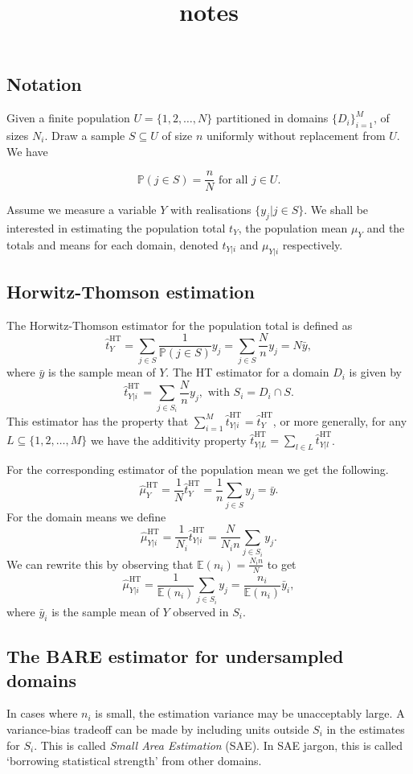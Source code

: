 \documentclass[fleqn,11pt]{article}
\title{notes}
\begin{document}
\subsection*{Notation}
Given a finite population $U=\{1,2,\ldots, N\}$ partitioned in domains
$\{D_i\}_{i=1}^M$, of sizes $N_i$.  Draw a sample $S\subseteq U$ of size
$n$ uniformly without replacement from $U$. We have

$$
\mathbb{P}(j\in S) = \frac{n}{N}\textrm{ for all } j\in U.
$$

Assume we measure a variable $Y$ with realisations $\{y_j|j\in S\}$. We shall
be interested in estimating the population total $t_Y$, the population mean
$\mu_Y$ and the totals and means for each domain, denoted $t_{Y|i}$ and $\mu_{Y|i}$
respectively.

\subsection*{Horwitz-Thomson estimation}
The Horwitz-Thomson estimator for the population total is defined as
$$
\hat{t}^{\textrm{HT}}_Y = \sum_{j\in S} \frac{1}{\mathbb{P}(j\in S)}y_j
=\sum_{j\in S}\frac{N}{n}y_j = N\bar{y},
$$
where $\bar{y}$ is the sample mean of $Y$.  The HT estimator for a domain $D_i$
is given by
$$
\hat{t}_{Y|i}^{\textrm{HT}} = \sum_{j\in S_i}\frac{N}{n}y_j,\textrm{ with } S_i=D_i\cap S.
$$
This estimator has the property that
$\sum_{i=1}^M\hat{t}_{Y|i}^{\textrm{HT}}=\hat{t}_{Y}^{\textrm{HT}}$, or more
generally, for any $L\subseteq \{1,2,\ldots,M\}$ we have the additivity
property $\hat{t}^{\textrm{HT}}_{Y|L} = \sum_{l\in
L}\hat{t}^{\textrm{HT}}_{Y|l}$.


For the corresponding estimator of the population mean we get the following.
$$
\hat{\mu}_{Y}^{\textrm{HT}} = \frac{1}{N}\hat{t}^{\textrm{HT}}_Y = 
\frac{1}{n}\sum_{j\in S}y_j = \bar{y}.
$$
For the domain means we define
$$
\hat{\mu}_{Y|i}^{\textrm{HT}} = \frac{1}{N_i}\hat{t}^{\textrm{HT}}_{Y|i}
= \frac{N}{N_i n}\sum_{j\in S_i}y_j.
$$
We can rewrite this by observing that $\mathbb{E}(n_i)=\frac{N_in}{N}$ to get
$$
\hat{\mu}_{Y|i}^{\textrm{HT}} = \frac{1}{\mathbb{E}(n_i)}\sum_{j\in S_i}y_j
=\frac{n_i}{\mathbb{E}(n_i)}\bar{y}_i,
$$
where $\bar{y}_i$ is the sample mean of $Y$ observed in $S_i$.

\subsection*{The BARE estimator for undersampled domains}
In cases where $n_i$ is small, the estimation variance may be unacceptably
large.  A variance-bias tradeoff can be made by including units outside $S_i$
in the estimates for $S_i$. This is called \emph{Small Area Estimation} (SAE).
In SAE jargon, this is called `borrowing statistical strength' from other
domains.
\end{document}
